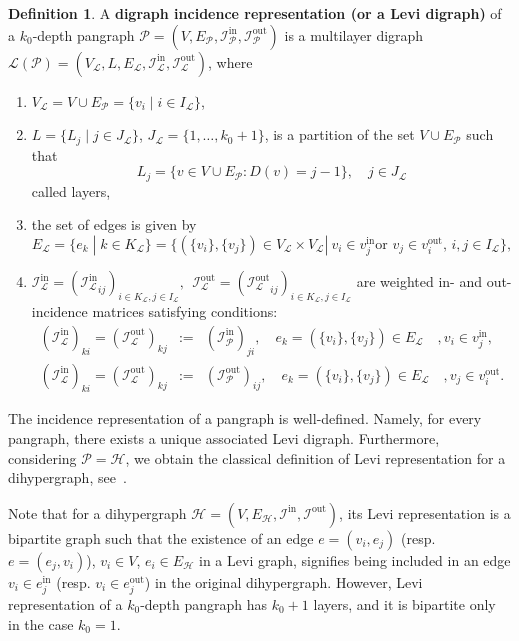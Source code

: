 \documentclass[a4paper,12pt]{article}
\theoremstyle{definition}
\newtheorem{definition}{Definition}
\theoremstyle{remark}
\newcommand{\mH}{\mathcal{H}}
\newcommand{\mP}{\mathcal{P}}
\newcommand{\mL}{\mathcal{L}}
\newcommand{\EH}{E_{\mathcal{H}}}
\newcommand{\EP}{E_{\mathcal{P}}}
\newcommand{\tin}{\mathrm{in}}
\newcommand{\out}{\mathrm{out}}
\newcommand{\inci}{\mathcal{I}^{\tin}}
\newcommand{\incip}{\mathcal{I}^{\tin}_{\mP}}
\newcommand{\inco}{\mathcal{I}^{\out}}
\newcommand{\incop}{\mathcal{I}^{\out}_{\mP}}
\begin{document}
\begin{definition}\label{def:levi-graph}
    A \textbf{digraph incidence representation (or a Levi digraph)} of a $k_0$-depth pangraph $\mathcal{P}=(V, \EP,\incip,\incop )$ is a multilayer digraph $\mL(\mathcal{P})=(V_{\mL}, L, E_{\mathcal{L}},\inci_{\mathcal{L}}, \inco_{\mathcal{L}})$, where
    \begin{enumerate}
    \item $V_{\mL}=V\cup \EP=\{v_i\;|\; i\in I_{\mL}\}$,
        \item $L = \{L_j\;|\;j\in J_{\mL}\}$, $J_{\mL}=\{1,\ldots,k_0+1\}$, is a partition of the set $V \cup E_\mathcal{P}$ such that  
        \begin{equation}
            L_j = \{v \in V \cup E_\mathcal{P}: D(v) = j-1\}, \quad j\in J_{\mL}\label{eq:wartswyL}
        \end{equation}
        called layers,
        \item the set of edges is given by 
        \begin{equation}
        E_{\mathcal{L}}=\{e_k \; | \; k \in K_\mL\}=\{(\{v_i\},\{v_j\})\in V_\mL \times V_\mL |\ v_i \in v_j^{\mathrm{in}} \text{or}\,\, v_j \in v_i^{\mathrm{out}},\,i,j\in I_\mL\},
        \end{equation}
        \item $\inci_{\mL}=({\inci_\mL}_{ij})_{i\in K_\mL, j \in I_\mL}, \ \  \inco_{\mL}=({\inco_{\mL}}_{ij})_{i\in K_\mL, j \in I_\mL}$ are weighted in- and out- incidence matrices satisfying conditions: 
        \begin{eqnarray*} 
        (\mathcal{I}_{\mL}^\tin)_{ki}=(\mathcal{I}_{\mL}^\out)_{kj}&:=&(\mathcal{I}_{\mP}^\tin)_{ji}, \quad  e_k=(\{v_i\},\{v_j\})\in E_{\mathcal{L}}\quad , v_{i} \in v_{j}^{\tin},\\
        (\mathcal{I}_{\mL}^\tin)_{ki}=(\mathcal{I}_{\mL}^\out)_{kj}&:=&(\mathcal{I}_{\mP}^{\out})_{ij}, \quad e_k=(\{v_i\},\{v_j\})\in E_{\mathcal{L}}\quad , v_{j} \in v_{i}^{\out}.
        \end{eqnarray*}
    \end{enumerate} 
\end{definition}

The incidence representation of a pangraph is well-defined. Namely, for every pangraph, there exists a unique associated Levi digraph. Furthermore, considering $\mP=\mH$, we obtain the classical definition of Levi representation for a dihypergraph, see~\protect\cite{Levi}. 

Note that for a dihypergraph $\mH= (V,\EH,\inci,\inco)$, its Levi representation is a bipartite graph such that the existence of an edge $e=({v_i},{e_j})$  (resp. $e=({e_j},{v_i})$), $v_i\in V$, $e_i\in \EH$ in a Levi graph, signifies being included in an edge $v_i\in e_j^{\tin}$ (resp. $v_i\in e_j^{\out}$) in the original dihypergraph. However, Levi representation of a $k_0$-depth pangraph has $k_0+1$ layers, and it is bipartite only in the case $k_0=1$. 
\end{document}
